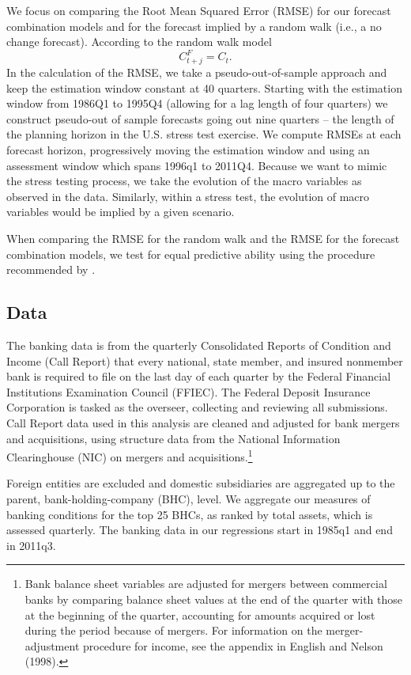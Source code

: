 \documentclass[12pt]{article}
\begin{document}
We focus on comparing the Root Mean Squared Error (RMSE) for our
forecast combination models and for the forecast implied by a
random walk (i.e., a no change forecast). According to the random
walk model
\begin{equation}
C^F_{t+j} =  C_t.
\end{equation}
In the calculation of the RMSE, we take a pseudo-out-of-sample
approach and keep the estimation window constant at 40 quarters.
Starting with the estimation window from 1986Q1 to 1995Q4
(allowing for a lag length of four quarters) we construct
pseudo-out of sample forecasts going out nine quarters -- the
length of the planning horizon in the U.S. stress test exercise.
We compute RMSEs at each forecast horizon, progressively moving
the estimation window and using an assessment window which spans
1996q1 to 2011Q4. Because we want to mimic the stress testing
process, we take the evolution of the macro variables as observed
in the data. Similarly, within a stress test, the evolution of
macro variables would be implied by a given scenario.

When comparing the RMSE for the random walk and the RMSE for the
forecast combination models, we test for equal predictive ability
using the procedure recommended by .

\subsection{Data}

The banking data is from the quarterly Consolidated Reports of
Condition and Income (Call Report) that every national, state
member, and insured nonmember bank is required to file on the last
day of each quarter by the Federal Financial Institutions
Examination Council (FFIEC). The Federal Deposit Insurance
Corporation is tasked as the overseer, collecting and reviewing
all submissions. Call Report data used in this analysis are
cleaned and adjusted for bank mergers and acquisitions, using
structure data from the National Information Clearinghouse (NIC)
on mergers and acquisitions.\footnote{ Bank balance sheet
variables are adjusted for mergers between commercial banks by
comparing balance sheet values at the end of the quarter with
those at the beginning of the quarter, accounting for amounts
acquired or lost during the period because of mergers. For
information on the merger-adjustment procedure for income, see the
appendix in English and Nelson (1998).}

Foreign entities are excluded and domestic subsidiaries are
aggregated up to the parent, bank-holding-company (BHC), level. We
aggregate our measures of banking conditions for the top 25 BHCs,
as ranked by total assets, which is assessed quarterly. The
banking data in our regressions start in 1985q1 and end in 2011q3.
\end{document}
